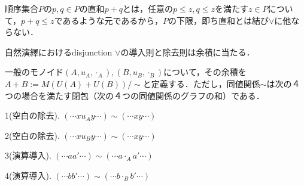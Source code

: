 \documentclass[uplatex, dvipdfmx]{jsarticle}
\begin{document}
\begin{example}
    順序集合$P$の$p,q\in P$の直和$p+q$とは，任意の$p\le z,q\le z$を満たす$z\in P$について，$p+q\le z$であるような元であるから，$P$の下限，即ち直和とは結び$\lor$に他ならない．
\end{example}

\begin{example}[証明の圏にて]
    自然演繹におけるdisjunction $\lor$の導入則と除去則は余積に当たる．
\end{example}

\begin{example}[一般のモノイドの余積]
    \begin{definition*}[一般のモノイドの余積]
        一般のモノイド$(A,u_A,\cdot_A),(B,u_B,\cdot_B)$について，その余積を$A+B:=M(U(A)+U(B))/\sim$と定義する．ただし，同値関係$\sim$は次の４つの場合を満たす閉包（次の４つの同値関係のグラフの和）である．
        
        1(空白の除去). $(\cdots xu_Ay\cdots)\sim (\cdots xy\cdots)$

        2(空白の除去). $(\cdots xu_By\cdots)\sim (\cdots xy\cdots)$

        3(演算導入). $(\cdots aa'\cdots)\sim (\cdots a\cdot_Aa'\cdots)$

        4(演算導入). $(\cdots bb'\cdots)\sim (\cdots b\cdot_Bb'\cdots)$


\end{definition*}
\end{example}
\end{document}
